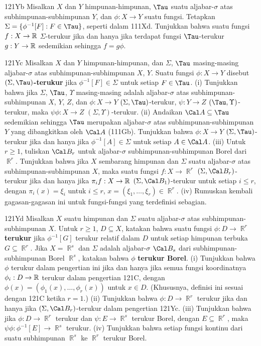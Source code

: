 {\spheader 121Yb Misalkan $X$ dan $Y$ himpunan-himpunan, $\Tau$ suatu
aljabar-$\sigma$ atas subhimpunan-subhimpunan $Y$, dan $\phi:X\to Y$
suatu fungsi. Tetapkan $\Sigma=\{\phi^{-1}[F]:F\in\Tau\}$, seperti
dalam 111Xd. Tunjukkan bahwa suatu fungsi $f:X\to\Bbb R$
$\Sigma$-terukur jika dan hanya jika terdapat fungsi $\Tau$-terukur
$g:Y\to\Bbb R$ sedemikian sehingga $f=g\phi$.

\spheader 121Yc Misalkan $X$ dan $Y$ himpunan-himpunan, dan $\Sigma$,
$\Tau$ masing-masing aljabar-$\sigma$ atas subhimpunan-subhimpunan
$X$, $Y$. Suatu fungsi $\phi:X\to Y$ disebut
{\bf $(\Sigma,\Tau)$-terukur} jika $\phi^{-1}[F]\in\Sigma$ untuk
setiap $F\in\Tau$.
(i) Tunjukkan bahwa jika $\Sigma$, $\Tau$, $\Upsilon$ masing-masing
adalah aljabar-$\sigma$ atas subhimpunan-subhimpunan $X$, $Y$, $Z$,
dan $\phi:X\to Y$ $(\Sigma,\Tau)$-terukur,
$\psi:Y\to Z$ $(\Tau,\Upsilon)$-terukur, maka $\psi\phi:X\to Z$
$(\Sigma,\Upsilon)$-terukur.
(ii) Andaikan $\Cal A\subseteq\Tau$ sedemikian sehingga $\Tau$
merupakan aljabar-$\sigma$ atas subhimpunan-subhimpunan $Y$ yang
dibangkitkan oleh $\Cal A$ (111Gb). Tunjukkan bahwa $\phi:X\to Y$
$(\Sigma,\Tau)$-terukur jika dan hanya jika
$\phi^{-1}[A]\in\Sigma$ untuk setiap $A\in\Cal A$.
(iii) Untuk $r\ge 1$, tuliskan $\Cal B_r$ untuk aljabar-$\sigma$
subhimpunan-subhimpunan Borel dari $\BbbR^r$. Tunjukkan bahwa jika $X$
sembarang himpunan dan $\Sigma$ suatu aljabar-$\sigma$ atas
subhimpunan-subhimpunan $X$, maka suatu fungsi $f:X\to\BbbR^r$
$(\Sigma,\Cal B_r)$-terukur jika dan hanya jika
$\pi_if:X\to\Bbb R$ $(\Sigma,\Cal B_1)$-terukur untuk setiap
$i\le r$, dengan $\pi_i(x)=\xi_i$ untuk $i\le r$,
$x=(\xi_1,\ldots,\xi_r)\in\BbbR^r$.
(iv) Rumuskan kembali gagasan-gagasan ini untuk fungsi-fungsi yang
terdefinisi sebagian.

\spheader 121Yd Misalkan $X$ suatu himpunan dan $\Sigma$ suatu
aljabar-$\sigma$ atas subhimpunan-subhimpunan $X$. Untuk $r\ge 1$,
$D\subseteq X$, katakan bahwa suatu fungsi $\phi:D\to\BbbR^r$
{\bf terukur} jika $\phi^{-1}[G]$ terukur relatif dalam $D$ untuk
setiap himpunan terbuka $G\subseteq\BbbR^r$. Jika $X=\BbbR^s$ dan
$\Sigma$ adalah aljabar-$\sigma$ $\Cal B_s$ dari subhimpunan-subhimpunan
Borel $\BbbR^s$, katakan bahwa $\phi$ {\bf terukur Borel}.
(i) Tunjukkan bahwa $\phi$ terukur dalam pengertian ini jika dan hanya
jika semua fungsi koordinatnya $\phi_i:D\to\Bbb R$ terukur dalam
pengertian 121C, dengan $\phi(x)=(\phi_1(x),\ldots,\phi_r(x))$ untuk
$x\in D$. (Khususnya, definisi ini sesuai dengan 121C ketika $r=1$.)
(ii) Tunjukkan bahwa $\phi:D\to\BbbR^r$ terukur jika dan hanya jika
$(\Sigma,\Cal B_r)$-terukur dalam pengertian 121Yc.
(iii) Tunjukkan bahwa jika $\phi:D\to\BbbR^r$ terukur dan
$\psi:E\to\BbbR^s$ terukur Borel, dengan $E\subseteq\BbbR^r$, maka
$\psi\phi:\phi^{-1}[E]\to\BbbR^s$ terukur.
(iv) Tunjukkan bahwa setiap fungsi kontinu dari suatu subhimpunan
$\BbbR^s$ ke $\BbbR^r$ terukur Borel.

}
